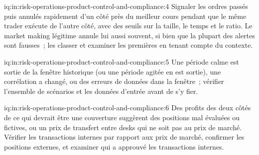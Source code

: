 \begin{solution}{iq:in:risk-operations-product-control-and-compliance:4}
Signaler les ordres passés puis annulés rapidement d'un côté près du meilleur cours pendant que le même trader exécute de l'autre côté,
avec des seuils sur la taille, le temps et le ratio. Le market making légitime annule lui aussi souvent, si bien que la plupart des alertes sont fausses~; les classer
et examiner les premières en tenant compte du contexte.
\end{solution}

\begin{solution}{iq:in:risk-operations-product-control-and-compliance:5}
Une période calme est sortie de la fenêtre historique (ou une période agitée en est sortie), une corrélation a changé, ou des erreurs de données dans la
fenêtre~; vérifier l'ensemble de scénarios et les données d'entrée avant de s'y fier.
\end{solution}

\begin{solution}{iq:in:risk-operations-product-control-and-compliance:6}
Des profits des deux côtés de ce qui devrait être une couverture suggèrent des positions mal évaluées ou fictives, ou un prix de transfert entre
desks qui ne soit pas au prix de marché. Vérifier les transactions internes par rapport aux prix de marché, confirmer les positions externes, et examiner
qui a approuvé les transactions internes.
\end{solution}
